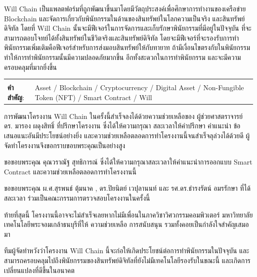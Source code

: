 \documentclass[12pt,oneside,openright,a4paper]{cpe-thai-project}
\begin{document}
Will Chain เป็นแพลตฟอร์มที่ถูกพัฒนาขึ้นมาโดยมีวัตถุประสงค์เพื่อศึกษาการทำงานของเครือข่าย Blockchain  และจัดการเกี่ยวกับพินัยกรรมในด้านของสินทรัพย์ในโลกความเป็นจริง และสินทรัพย์ดิจิทัล โดยที่ Will Chain นั้นจะมีฟีเจอร์ในการจัดการและเก็บรักษาพินัยกรรมที่มีอยู่ในปัจจุบัน ที่จะสามารถตอบโจทย์ได้ทั้งสินทรัพย์ในชีวิตจริงและสินทรัพย์ดิจิทัล โดยจะมีฟีเจอร์ที่จะรองรับการทำพินัยกรรมเพิ่มเติมคือฟีเจอร์สำหรับการส่งมอบสินทรัพย์ให้กับทายาท ถ้ามีเงื่อนไขตรงกับในพินัยกรรม ทำให้การทำพินัยกรรมนั้นมีความปลอดภัยมากขึ้น อีกทั้งสะดวกในการทำพินัยกรรม และจะมีความครอบคลุมที่มากยิ่งขึ้น
\begin{flushleft}
\begin{tabular*}{\textwidth}{@{}lp{}}
 & \\

\textbf{คำสำคัญ}: & Asset / Blockchain / Cryptocurrency / Digital Asset / Non-Fungible Token (NFT) /  Smart Contract / Will 
\end{tabular*}
\end{flushleft}
\endabstract


\preface
\tab การพัฒนาโครงงาน Will Chain ในครั้งนี้สําเร็จลงได้ด้วยความช่วยเหลือของ ผู้ช่วยศาสตราจารย์ ดร. มารอง ผดุงสิทธิ์ ที่ปรึกษาโครงงาน ซึ่งได้ให้ความกรุณา สละเวลาให้คําปรึกษา คําแนะนํา ข้อเสนอแนะอันมีประโยชน์อย่างยิ่ง และความช่วยเหลือตลอดการทําโครงงานนี้จนสําเร็จลุล่วงได้ด้วยดี ผู้จัดทําโครงงานจึงขอกราบขอบพระคุณเป็นอย่างสูง

\tab ขอขอบพระคุณ คุณวราณัฐ สุทธิการณ์ ซึ่งได้ให้ความกรุณาสละเวลาให้คําแนะนําการออกแบบ Smart Contract และความช่วยเหลือตลอดการทำโครงงานนี้

\tab ขอขอบพระคุณ ผ.ศ.สุรพนธ์ ตุ้มนาค , ดร.ปิยนิตย์ เวปุลานนท์ และ รศ.ดร.ธํารงรัตน์ อมรรักษา ที่ได้สละเวลา
ร่วมเป็นคณะกรรมการตรวจสอบโครงงานในครั้งนี้ 

\tab ท้ายที่สุดนี้ โครงงานนี้อาจจะไม่สําเร็จเลยหากไม่มีเพื่อนในภาควิชาวิศวกรรมคอมพิวเตอร์ มหาวิทยาลัยเทคโนโลยีพระจอมเกล้าธนบุรีที่ให้ 
ความช่วยเหลือ การสนับสนุน รวมทั้งคอยเป็นกําลังใจสําคัญเสมอมา 

\tab ทีมผู้จัดทำหวังว่าโครงงาน Will Chain นี้จะก่อให้เกิดประโยชน์ต่อการทำพินัยกรรมในปัจจุบัน และสามารถครอบคลุมไปถึงพินัยกรรมของสินทรัพย์ดิจิทัลที่ยังไม่มีเทคโนโลยีรองรับในขณะนี้ และเกิดการเปลี่ยนแปลงที่ดีขึ้นในอนาคต

\tableofcontents                    
\listoftables
\listoffigures                      
\end{document}
